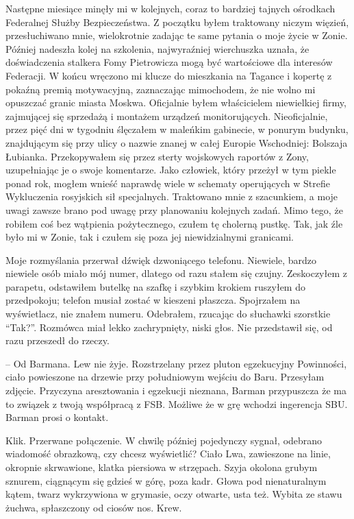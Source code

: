 \documentclass[../MAIN.tex]{subfiles}
\begin{document}
Następne miesiące minęły mi w kolejnych, coraz to bardziej
tajnych ośrodkach Federalnej Służby Bezpieczeństwa. Z początku
byłem traktowany niczym więzień, przesłuchiwano mnie,
wielokrotnie zadając te same pytania o moje życie w Zonie.
Później nadeszła kolej na szkolenia, najwyraźniej wierchuszka
uznała, że doświadczenia stalkera Fomy Pietrowicza mogą być
wartościowe dla interesów Federacji. W końcu wręczono mi klucze
do mieszkania na Tagance i kopertę z pokaźną premią
motywacyjną, zaznaczając mimochodem, że nie wolno mi opuszczać
granic miasta Moskwa. Oficjalnie byłem właścicielem niewielkiej
firmy, zajmującej się sprzedażą i montażem urządzeń
monitorujących. Nieoficjalnie, przez pięć dni w tygodniu
ślęczałem w maleńkim gabinecie, w ponurym budynku, znajdującym
się przy ulicy o nazwie znanej w całej Europie Wschodniej:
Bolszaja Łubianka. Przekopywałem się przez sterty wojskowych
raportów z Zony, uzupełniając je o swoje komentarze. Jako
człowiek, który przeżył w tym piekle ponad rok, mogłem wnieść
naprawdę wiele w schematy operujących w Strefie Wykluczenia
rosyjskich sił specjalnych. Traktowano mnie z szacunkiem, a
moje uwagi zawsze brano pod uwagę przy planowaniu kolejnych
zadań. Mimo tego, że robiłem coś bez wątpienia pożytecznego,
czułem tę cholerną pustkę. Tak, jak źle było mi w Zonie, tak i
czułem się poza jej niewidzialnymi granicami.

Moje rozmyślania przerwał dźwięk dzwoniącego telefonu.
Niewiele, bardzo niewiele osób miało mój numer, dlatego od razu
stałem się czujny. Zeskoczyłem z parapetu, odstawiłem butelkę
na szafkę i szybkim krokiem ruszyłem do przedpokoju; telefon
musiał zostać w kieszeni płaszcza. Spojrzałem na wyświetlacz,
nie znałem numeru. Odebrałem, rzucając do słuchawki szorstkie
“Tak?”. Rozmówca miał lekko zachrypnięty, niski głos. Nie
przedstawił się, od razu przeszedł do \mbox{rzeczy}.

-- Od Barmana. Lew nie żyje. Rozstrzelany przez pluton
egzekucyjny Powinności, ciało powieszone na drzewie przy
południowym wejściu do Baru. Przesyłam zdjęcie. Przyczyna
aresztowania i egzekucji nieznana, Barman przypuszcza że ma to
związek z twoją współpracą z FSB. Możliwe że w grę wchodzi
ingerencja SBU. Barman prosi o kontakt.

Klik. Przerwane połączenie. W chwilę później pojedynczy sygnał,
odebrano wiadomość obrazkową, czy chcesz wyświetlić? Ciało Lwa,
zawieszone na linie, okropnie skrwawione, klatka piersiowa w
strzępach. Szyja okolona grubym sznurem, ciągnącym się gdzieś w
górę, poza kadr. Głowa pod nienaturalnym kątem, twarz
wykrzywiona w grymasie, oczy otwarte, usta też. Wybita ze stawu
żuchwa, spłaszczony od ciosów nos. Krew.
\end{document}
